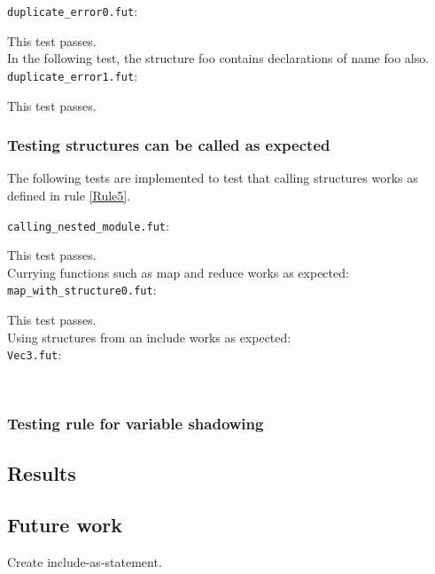 \texttt{duplicate_error0.fut}:

This test passes.
\\
In the following test, the structure foo contains declarations of name foo also.
\texttt{duplicate_error1.fut}:

This test passes.

\subsubsection{Testing structures can be called as expected}
The following tests are implemented to test that calling structures works as
defined in rule \ref{Rule5}.

\texttt{calling_nested_module.fut}:

This test passes.
\\
Currying functions such as map and reduce works as expected:\\
\texttt{map_with_structure0.fut}:

This test passes.
\\
Using structures from an include works as expected:\\
\texttt{Vec3.fut}:

\
\subsubsection{Testing rule for variable shadowing}

\subsection{Results}
\label{subsec:label}

\subsection{Future work}
\label{subsec:structuresfuturework}
Create include-as-statement.

